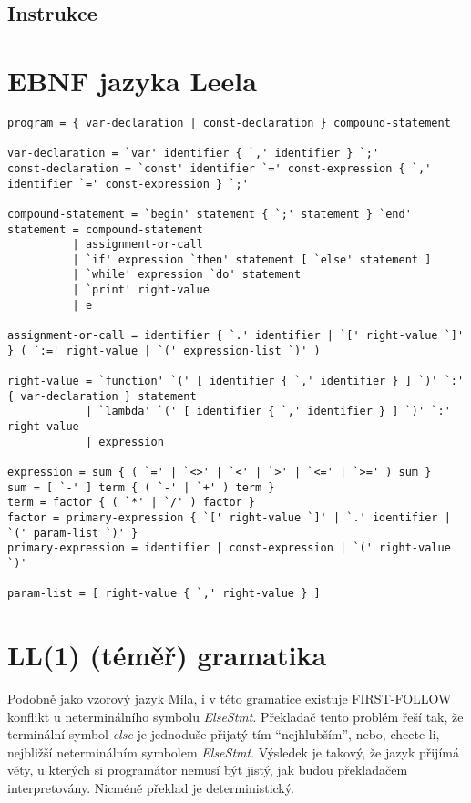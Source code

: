 \documentclass[10pt,a4paper]{article}
\begin{document}
\subsection{Instrukce}



\section{EBNF jazyka Leela}
\label{sec:ebnf}

\begin{lstlisting}[identifierstyle=\textbf]
program = { var-declaration | const-declaration } compound-statement

var-declaration = `var' identifier { `,' identifier } `;'
const-declaration = `const' identifier `=' const-expression { `,' identifier `=' const-expression } `;'

compound-statement = `begin' statement { `;' statement } `end'
statement = compound-statement
          | assignment-or-call
          | `if' expression `then' statement [ `else' statement ]
          | `while' expression `do' statement
          | `print' right-value
          | e

assignment-or-call = identifier { `.' identifier | `[' right-value `]' } ( `:=' right-value | `(' expression-list `)' )

right-value = `function' `(' [ identifier { `,' identifier } ] `)' `:' { var-declaration } statement
            | `lambda' `(' [ identifier { `,' identifier } ] `)' `:' right-value
            | expression

expression = sum { ( `=' | `<>' | `<' | `>' | `<=' | `>=' ) sum }
sum = [ `-' ] term { ( `-' | `+' ) term }
term = factor { ( `*' | `/' ) factor }
factor = primary-expression { `[' right-value `]' | `.' identifier | `(' param-list `)' }
primary-expression = identifier | const-expression | `(' right-value `)'

param-list = [ right-value { `,' right-value } ]

\end{lstlisting}

\section{LL(1) (téměř) gramatika}

Podobně jako vzorový jazyk Míla, i v této gramatice existuje FIRST-FOLLOW
konflikt u neterminálního symbolu \textit{ElseStmt}. Překladač tento problém
řeší tak, že terminální symbol \textit{else} je jednoduše přijatý tím
``nejhlubším'', nebo, chcete-li, nejbližší neterminálním symbolem
\textit{ElseStmt}. Výsledek je takový, že jazyk přijímá věty, u kterých si
programátor nemusí být jistý, jak budou překladačem interpretovány. Nicméně
překlad je deterministický.
\end{document}
